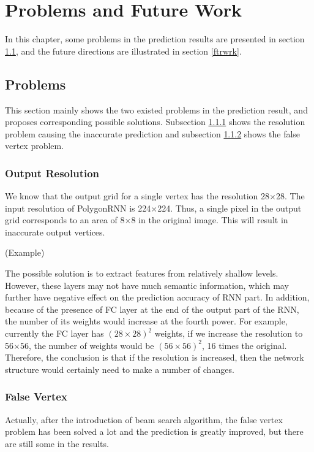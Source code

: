 \chapter{Problems and Future Work}\label{prbftr}

In this chapter, some problems in the prediction results are presented in section \ref{prblms}, and the future directions are illustrated in section \ref{ftrwrk}.

\section{Problems}\label{prblms}

This section mainly shows the two existed problems in the prediction result, and proposes corresponding possible solutions. Subsection \ref{outres} shows the resolution problem causing the inaccurate prediction and subsection \ref{flsvtx} shows the false vertex problem.

\subsection{Output Resolution}\label{outres}
We know that the output grid for a single vertex has the resolution 28$\times$28. The input resolution of PolygonRNN is 224$\times$224. Thus, a single pixel in the output grid corresponds to an area of 8$\times$8 in the original image. This will result in inaccurate output vertices.

(Example)

The possible solution is to extract features from relatively shallow levels. However, these layers may not have much semantic information, which may further have negative effect on the prediction accuracy of RNN part. In addition, because of the presence of FC layer at the end of the output part of the RNN, the number of its weights would increase at the fourth power. For example, currently the FC layer has $(28\times28)^2$ weights, if we increase the resolution to 56$\times56$, the number of weights would be $(56\times56)^2$, 16 times the original. Therefore, the conclusion is that if the resolution is increased, then the network structure would certainly need to make a number of changes.

\subsection{False Vertex}\label{flsvtx}
Actually, after the introduction of beam search algorithm, the false vertex problem has been solved a lot and the prediction is greatly improved, but there are still some in the results.

